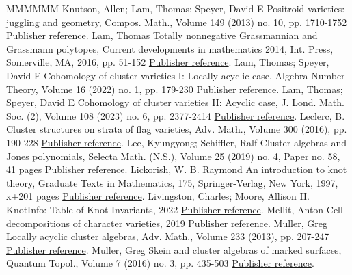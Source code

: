 \documentclass[11pt]{article}
\theoremstyle{definition}
\numberwithin{equation}{section}
\begin{document}
\begin{thebibliography}{MMMMMM}
 Knutson, Allen; Lam, Thomas; Speyer, David E Positroid varieties: juggling and geometry, Compos. Math., Volume 149 (2013) no. 10, pp. 1710-1752 \href{https://alco.centre-mersenne.org/articles/10.5802/alco.345/#KLS}{Publisher reference}.
 Lam, Thomas Totally nonnegative Grassmannian and Grassmann polytopes, Current developments in mathematics 2014, Int. Press, Somerville, MA, 2016, pp. 51-152 \href{https://alco.centre-mersenne.org/articles/10.5802/alco.345/#LamCDM}{Publisher reference}.
 Lam, Thomas; Speyer, David E Cohomology of cluster varieties I: Locally acyclic case, Algebra Number Theory, Volume 16 (2022) no. 1, pp. 179-230 \href{https://alco.centre-mersenne.org/articles/10.5802/alco.345/#LS}{Publisher reference}.
 Lam, Thomas; Speyer, David E Cohomology of cluster varieties II: Acyclic case, J. Lond. Math. Soc. (2), Volume 108 (2023) no. 6, pp. 2377-2414 \href{https://alco.centre-mersenne.org/articles/10.5802/alco.345/#LS2}{Publisher reference}.
 Leclerc, B. Cluster structures on strata of flag varieties, Adv. Math., Volume 300 (2016), pp. 190-228 \href{https://alco.centre-mersenne.org/articles/10.5802/alco.345/#Lec}{Publisher reference}.
 Lee, Kyungyong; Schiffler, Ralf Cluster algebras and Jones polynomials, Selecta Math. (N.S.), Volume 25 (2019) no. 4, Paper no. 58, 41 pages \href{https://alco.centre-mersenne.org/articles/10.5802/alco.345/#LeeSch}{Publisher reference}.
 Lickorish, W. B. Raymond An introduction to knot theory, Graduate Texts in Mathematics, 175, Springer-Verlag, New York, 1997, x+201 pages \href{https://alco.centre-mersenne.org/articles/10.5802/alco.345/#Lickorish}{Publisher reference}.
 Livingston, Charles; Moore, Allison H. KnotInfo: Table of Knot Invariants, 2022 \href{https://alco.centre-mersenne.org/articles/10.5802/alco.345/#knotinfo}{Publisher reference}.
 Mellit, Anton Cell decompositions of character varieties, 2019 \href{https://alco.centre-mersenne.org/articles/10.5802/alco.345/#Mellit_Cell}{Publisher reference}.
 Muller, Greg Locally acyclic cluster algebras, Adv. Math., Volume 233 (2013), pp. 207-247 \href{https://alco.centre-mersenne.org/articles/10.5802/alco.345/#Muller}{Publisher reference}.
 Muller, Greg Skein and cluster algebras of marked surfaces, Quantum Topol., Volume 7 (2016) no. 3, pp. 435-503 \href{https://alco.centre-mersenne.org/articles/10.5802/alco.345/#Muller_skein}{Publisher reference}.

\end{thebibliography}
\end{document}
